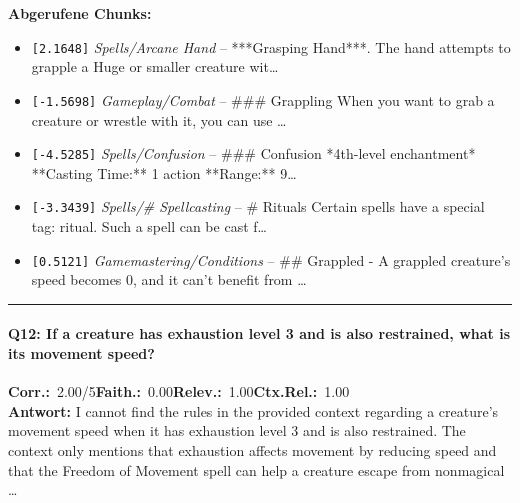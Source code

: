\noindent\textbf{Abgerufene Chunks:}
\begin{itemize}[noitemsep, topsep=2pt]
  \item[\textbf{\#1}] \texttt{[2.1648]} \textit{Spells/Arcane Hand} -- ***Grasping Hand***. The hand attempts to grapple a Huge or smaller creature wit\ldots
  \item[\textbf{\#2}] \texttt{[-1.5698]} \textit{Gameplay/Combat} -- \#\#\# Grappling  When you want to grab a creature or wrestle with it, you can use \ldots
  \item[\textbf{\#3}] \texttt{[-4.5285]} \textit{Spells/Confusion} -- \#\#\# Confusion  *4th-level enchantment*  **Casting Time:** 1 action  **Range:** 9\ldots
  \item[\textbf{\#4}] \texttt{[-3.3439]} \textit{Spells/# Spellcasting} -- \# Rituals  Certain spells have a special tag: ritual. Such a spell can be cast f\ldots
  \item[\textbf{\#5}] \texttt{[0.5121]} \textit{Gamemastering/Conditions} -- \#\# Grappled  - A grappled creature's speed becomes 0, and it can't benefit from \ldots
\end{itemize}
\vspace{4pt}
\hrule
\vspace{6pt}

\paragraph{Q12: If a creature has exhaustion level 3 and is also restrained, what is its movement speed?}
\noindent \textbf{Corr.:}~2.00/5\quad \textbf{Faith.:}~0.00\quad \textbf{Relev.:}~1.00\quad \textbf{Ctx.Rel.:}~1.00\\

\noindent\textbf{Antwort:} I cannot find the rules in the provided context regarding a creature's movement speed when it has exhaustion level 3 and is also restrained. The context only mentions that exhaustion affects movement by reducing speed and that the Freedom of Movement spell can help a creature escape from nonmagical \ldots

